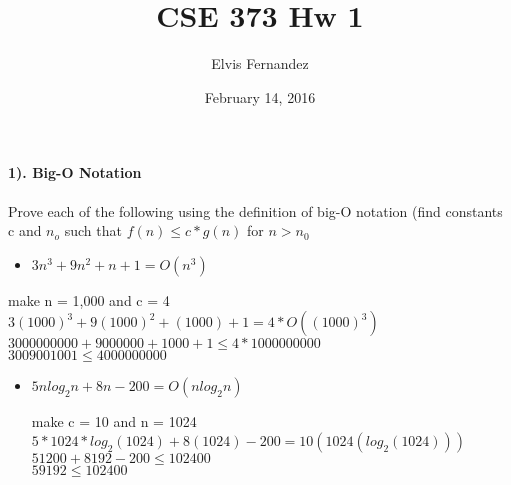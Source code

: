 \documentclass{article}
\title{CSE 373 Hw 1}
\author{Elvis Fernandez}
\date{February 14, 2016}
\begin{document}
\maketitle
\paragraph{1). Big-O Notation}
Prove each of the following using the definition of big-O notation (find constants c and 
\begin{math}
n_{o}\end{math} such that 
\begin{math} 
f(n) \leq c * g(n)
\end{math}
for
\begin{math}
n > n_{0}
\end{math}
\begin{itemize}
	\item
	\begin{math}3n^{3} + 9n^{2} + n + 1 = O(n^{3})\end{math}
\end{itemize}

\begin{center}
		make n = 1,000 and c = 4\\
		\begin{math}3(1000)^{3} + 9(1000)^{2} + (1000) + 1 = 4 * O((1000)^{3})
		\end{math}
		\begin{math}
		3000000000+9000000+1000+1 \leq 4*1000000000 \end{math}
		\\
		\begin{math}
			3009 001001 \leq 4000000000
		\end{math}	
\end{center}


\begin{itemize}
	\item
	\begin{math}5nlog_{2}n + 8n - 200 = O(nlog_{2}n)\end{math}
	\begin{center}
		make c = 10 and n = 1024
	\begin{math}
		5*1024*log_{2}(1024) + 8(1024) - 200 = 10(1024(log_{2}(1024)))		
	\end{math}
	\begin{math}
		51200 + 8192 - 200 \leq 102400
	\end{math}
	\\
	\begin{math}
		59192 \leq 102400
	\end{math}
		
	\end{center}
\end{itemize}
\end{document}
